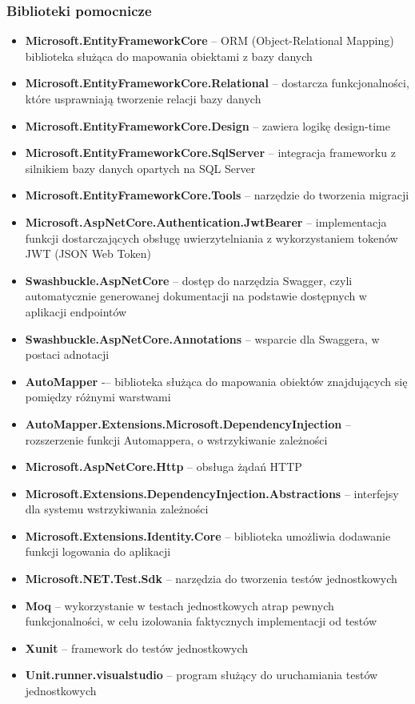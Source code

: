 \documentclass[a4paper,twoside,12pt]{book}
\begin{document}
\subsubsection{Biblioteki pomocnicze}
    \begin{itemize}
        \item \textbf{Microsoft.EntityFrameworkCore} -- ORM (Object-Relational Mapping) biblioteka służąca do mapowania obiektami z bazy danych 
        \item \textbf{Microsoft.EntityFrameworkCore.Relational} -- dostarcza funkcjonalności, które usprawniają tworzenie relacji bazy danych 
        \item \textbf{Microsoft.EntityFrameworkCore.Design} -- zawiera logikę design-time 
        \item \textbf{Microsoft.EntityFrameworkCore.SqlServer} -- integracja frameworku z silnikiem bazy danych opartych na SQL Server 
        \item \textbf{Microsoft.EntityFrameworkCore.Tools} -- narzędzie do tworzenia migracji 
        \item \textbf{Microsoft.AspNetCore.Authentication.JwtBearer} -- implementacja funkcji dostarczających obsługę uwierzytelniania z wykorzystaniem tokenów JWT (JSON Web Token) 
        \item \textbf{Swashbuckle.AspNetCore} -- dostęp do narzędzia Swagger, czyli automatycznie generowanej dokumentacji na podstawie dostępnych w aplikacji endpointów 
        \item \textbf{Swashbuckle.AspNetCore.Annotations} -- wsparcie dla Swaggera, w postaci adnotacji 
        \item \textbf{AutoMapper} -– biblioteka służąca do mapowania obiektów znajdujących się pomiędzy różnymi warstwami 
        \item \textbf{AutoMapper.Extensions.Microsoft.DependencyInjection} -- rozszerzenie funkcji Automappera, o wstrzykiwanie zależności 
        \item \textbf{Microsoft.AspNetCore.Http} -- obsługa żądań HTTP 
        \item \textbf{Microsoft.Extensions.DependencyInjection.Abstractions} -- interfejsy dla systemu wstrzykiwania zależności 
        \item \textbf{Microsoft.Extensions.Identity.Core} -- biblioteka umożliwia dodawanie funkcji logowania do aplikacji 
        \item \textbf{Microsoft.NET.Test.Sdk}  -- narzędzia do tworzenia testów jednostkowych 
        \item \textbf{Moq} -- wykorzystanie w testach jednostkowych atrap pewnych funkcjonalności, w celu izolowania faktycznych implementacji od testów 
        \item \textbf{Xunit} -- framework do testów jednostkowych 
        \item \textbf{Unit.runner.visualstudio} -- program służący do uruchamiania testów jednostkowych 
    \end{itemize}
\end{document}
